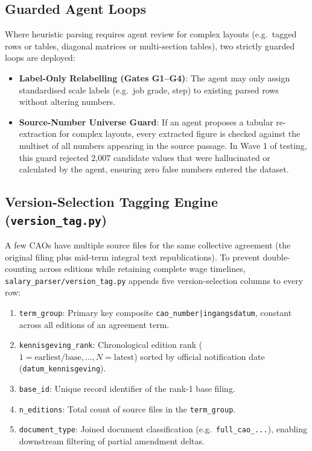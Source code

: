 \subsection{Guarded Agent Loops}
\label{subsec:salary-agent-loops}

Where heuristic parsing requires agent review for complex layouts (e.g.\ tagged rows or tables, diagonal matrices or multi-section tables), two strictly guarded loops are deployed:
\begin{itemize}[leftmargin=1.5em]
  \item \textbf{Label-Only Relabelling (Gates G1--G4)}: The agent may only assign standardised scale labels (e.g.\ job grade, step) to existing parsed rows without altering numbers.
  \item \textbf{Source-Number Universe Guard}: If an agent proposes a tabular re-extraction for complex layouts, every extracted figure is checked against the multiset of all numbers appearing in the source passage. In Wave 1 of testing, this guard rejected 2,007 candidate values that were hallucinated or calculated by the agent, ensuring zero false numbers entered the dataset.
\end{itemize}

\subsection{Version-Selection Tagging Engine (\texttt{version\_tag.py})}
\label{subsec:salary-version-tag}

A few CAOs have multiple source files for the same collective agreement (the original filing plus mid-term integral text republications). To prevent double-counting across editions while retaining complete wage timelines, \nolinkurl{salary_parser/version_tag.py} appends five version-selection columns to every row:
\begin{enumerate}[leftmargin=1.8em]
  \item \texttt{term\_group}: Primary key composite \texttt{cao\_number|ingangsdatum}, constant across all editions of an agreement term.
  \item \texttt{kennisgeving\_rank}: Chronological edition rank ($1 = \text{earliest/base}, \dots, N = \text{latest}$) sorted by official notification date (\texttt{datum\_kennisgeving}).
  \item \texttt{base\_id}: Unique record identifier of the rank-1 base filing.
  \item \texttt{n\_editions}: Total count of source files in the \texttt{term\_group}.
  \item \texttt{document\_type}: Joined document classification (e.g.\ \texttt{full\_cao\_...}), enabling downstream filtering of partial amendment deltas.
\end{enumerate}

